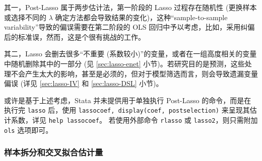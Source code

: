 其一，Post-Lasso 属于两步估计法，第一阶段的 Lasso 过程存在随机性 (更换样本或选择不同的 $\lambda$ 确定方法都会导致结果的变化)，这种“sample-to-sample
variability”导致的偏误需要在第二阶段的 OLS 回归中予以考虑，比如，采用纠偏后的标准误，然而，这是个很有挑战的工作。

其二，Lasso 会删去很多“不重要 (系数较小)”的变量，或者在一组高度相关的变量中随机删除其中的一部分 (见 \ref{sec:lasso-enet} 小节)。若研究目的是预测，这些处理不会产生太大的影响，甚至是必须的，但对于模型筛选而言，则会导致遗漏变量偏误 (详见 \ref{sec:lasso-IV} 和 \ref{sec:lasso-DSL} 小节)。

或许是基于上述考虑，Stata 并未提供用于单独执行 Post-Lasso 的命令，而是在执行完 \texttt{lasso} 后，使用 \texttt{lassocoef, display(coef, postselection)} 来呈现其估计系数，详见 \texttt{help lassocoef}。
若使用外部命令 \texttt{rlasso} 或 \texttt{lasso2}，则只需附加 \texttt{ols} 选项即可。 


\iffalse %

\subsubsection{样本拆分和交叉拟合估计量}

